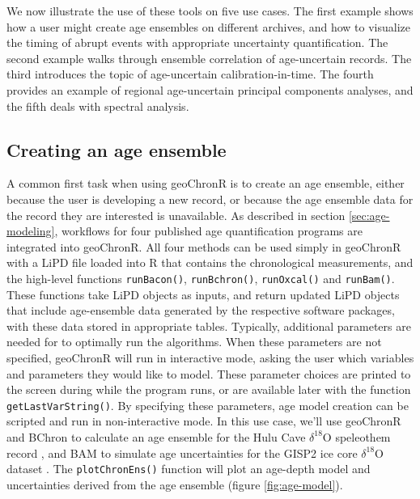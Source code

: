 \documentclass[gchron, manuscript]{copernicus}
\begin{document}
We now illustrate the use of these tools on five use cases.
The first example shows how a user might create age ensembles on different archives, and how to visualize the timing of abrupt events with appropriate uncertainty quantification.
The second example walks through ensemble correlation of age-uncertain records.
The third introduces the topic of age-uncertain calibration-in-time.
The fourth provides an example of regional age-uncertain principal components analyses, and the fifth deals with spectral analysis.

\subsection{Creating an age ensemble}

A common first task when using geoChronR is to create an age ensemble, either because the user is developing a new record, or because the age ensemble data for the record they are interested is unavailable.
As described in section \ref{sec:age-modeling}, workflows for four published age quantification programs are integrated into geoChronR.
All four methods can be used simply in geoChronR with a LiPD file loaded into R that contains the chronological measurements, and the high-level functions \texttt{runBacon()}, \texttt{runBchron()}, \texttt{runOxcal()} and \texttt{runBam()}.
These functions take LiPD objects as inputs, and return updated LiPD objects that include age-ensemble data generated by the respective software packages, with these data stored in appropriate tables.
Typically, additional parameters are needed for to optimally run the algorithms.
When these parameters are not specified, geoChronR will run in interactive mode, asking the user which variables and parameters they would like to model.
These parameter choices are printed to the screen during while the program runs, or are available later with the function \texttt{getLastVarString()}.
By specifying these parameters, age model creation can be scripted and run in non-interactive mode.
In this use case, we'll use geoChronR and BChron \citep{parnell2008flexible} to calculate an age ensemble for the Hulu Cave \(\delta^{18}\)O speleothem record \citep{hulu2001}, and BAM \citep{BAM} to simulate age uncertainties for the GISP2 ice core \(\delta^{18}\)O dataset \citep{alley}.
The \texttt{plotChronEns()} function will plot an age-depth model and uncertainties derived from the age ensemble (figure \ref{fig:age-model}).
\end{document}
